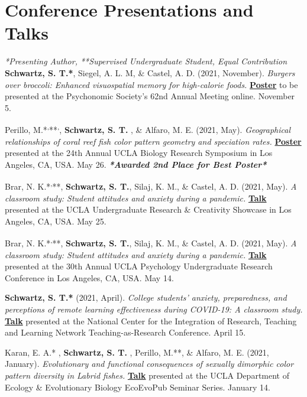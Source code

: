 \section*{Conference Presentations and Talks}
\textit{*Presenting Author, **Supervised Undergraduate Student, \dag{} Equal Contribution}\\

\textbf{Schwartz, S. T.*}, Siegel, A. L. M, \& Castel, A. D. (2021, November). \textit{Burgers over broccoli: Enhanced visuospatial memory for high-calorie foods.} \textbf{\underline{Poster}} to be presented at the Psychonomic Society's 62nd Annual Meeting online. November 5.

\pubspace

Perillo, M.*\textsuperscript{,}**\textsuperscript{,}\dag, \textbf{Schwartz, S. T. \dag}, \& Alfaro, M. E. (2021, May). \textit{Geographical relationships of coral reef fish color pattern geometry and speciation rates.} \textbf{\underline{Poster}} presented at the 24th Annual UCLA Biology Research Symposium in Los Angeles, CA, USA. May 26. \textbf{\textit{*Awarded 2nd Place for Best Poster*}}

\pubspace

Brar, N. K.*\textsuperscript{,}**, \textbf{Schwartz, S. T.}, Silaj, K. M., \& Castel, A. D. (2021, May). \textit{A classroom study: Student attitudes and anxiety during a pandemic.} \textbf{\underline{Talk}} presented at the UCLA Undergraduate Research \& Creativity Showcase in Los Angeles, CA, USA. May 25.

\pubspace

Brar, N. K.*\textsuperscript{,}**, \textbf{Schwartz, S. T.}, Silaj, K. M., \& Castel, A. D. (2021, May). \textit{A classroom study: Student attitudes and anxiety during a pandemic.} \textbf{\underline{Talk}} presented at the 30th Annual UCLA Psychology Undergraduate Research Conference in Los Angeles, CA, USA. May 14.

\pubspace

\textbf{Schwartz, S. T.*} (2021, April). \textit{College students’ anxiety, preparedness, and perceptions of remote learning effectiveness during COVID-19: A classroom study.} \textbf{\underline{Talk}} presented at the National Center for the Integration of Research, Teaching and Learning Network Teaching-as-Research Conference. April 15.

\pubspace

Karan, E. A.* \dag, \textbf{Schwartz, S. T. \dag}, Perillo, M.**, \& Alfaro, M. E. (2021, January). \textit{Evolutionary and functional consequences of sexually dimorphic color pattern diversity in Labrid fishes.} \textbf{\underline{Talk}} presented at the UCLA Department of Ecology \& Evolutionary Biology EcoEvoPub Seminar Series. January 14.

